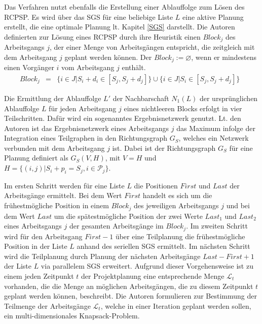\documentclass[a4paper,12pt,normalheadings,footexclude,headinclude,liststotoc,nochapterprefix,onecolumn,oneside,parskip,pointlessnumbers]{scrreprt}
\begin{document}
Das Verfahren nutzt ebenfalls die Erstellung einer Ablauffolge zum Lösen des RCPSP. Es wird über das SGS für eine beliebige Liste $L$ eine aktive Planung erstellt, die eine optimale Planung lt. Kapitel \ref{SGS} darstellt. Die Autoren definierten zur Lösung eines RCPSP durch ihre Heuristik einen $Block_{j}$ des Arbeitsgangs $j$, der einer Menge von Arbeitsgängen entspricht, die zeitgleich mit dem Arbeitsgang $j$ geplant werden können. Der $Block_{j} := \varnothing$, wenn er mindestens einen Vorgänger $i$ vom Arbeitsgang $j$ enthält.
\begin{eqnarray} \label{block}
Block_{j} & = &  \{ i \in J \vert S_{i}+d_{i} \in [ S_{j}, S_{j} + d_{j} ]\}\cup\{i\in J  \vert S_{i}\in  [ S_{j}, S_{j} + d_{j} ]\} \;\;
\end{eqnarray}

Die Ermittlung der Ablauffolge $L'$ der Nachbarschaft $N_{1}(L)$ der ursprünglichen Ablauffolge $L$ für jeden Arbeitsgang $j$ eines nichtleeren Blocks erfolgt in vier Teilschritten. Dafür wird ein sogenanntes Ergebnisnetzwerk genutzt. Lt. den Autoren ist das Ergebnisnetzwerk eines Arbeitsgangs $j$ das Maximum infolge der Integration eines Teilgraphen in den Richtungsgraph $G_{S}$, welches ein Netzwerk verbunden mit dem Arbeitsgang $j$ ist. Dabei ist der Richtungsgraph $G_{S}$ für eine Planung definiert als $G_{S}(V,H)$, mit $V=H$ und $H=\{ (i,j)\vert S_{i}+p_{i}=S_{j}, i \in \mathcal{P}_{j}\}$.

Im ersten Schritt werden für eine Liste $L$ die Positionen $First$ und $Last$ der Arbeitsgänge ermittelt. Bei dem Wert $First$ handelt es sich um die frühestmögliche Position in einem $Block_{j}$ des jeweiligen Arbeitsgangs $j$ und bei dem Wert $Last$ um die spätestmögliche Position der zwei Werte $Last_{1}$ und $Last_{2}$ eines Arbeitsgangs $j$ der gesamten Arbeitsgänge im $Block_{j}$. Im zweiten Schritt wird für den Arbeitsgang $First-1$ über eine Teilplanung die frühestmögliche Position in der Liste $L$ anhand des seriellen SGS ermittelt. Im nächsten Schritt wird die Teilplanung durch Planung der nächsten Arbeitsgänge $Last-First+1$ der Liste $L$ via parallelem SGS erweitert. Aufgrund dieser Vorgehensweise ist zu einem jeden Zeitpunkt $t$ der Projektplanung eine  entsprechende Menge $\mathcal{L}_{t}$ vorhanden, die die Menge an möglichen Arbeitsgängen, die zu diesem Zeitpunkt $t$ geplant werden können, beschreibt. Die Autoren formulieren zur Bestimmung der Teilmenge der Arbeitsgänge $\mathcal{L}_{t}$, welche in einer Iteration geplant werden sollen, ein multi-dimensionales Knapsack-Problem.
\end{document}
